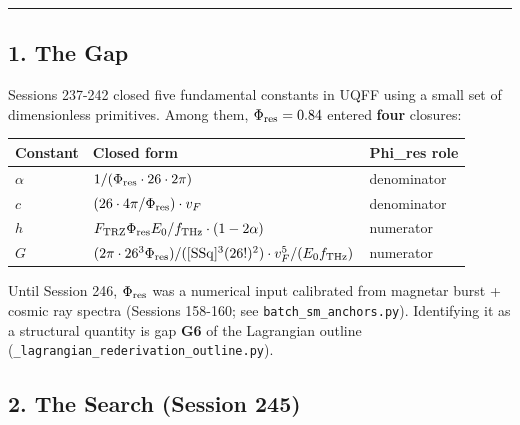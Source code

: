 \documentclass[
]{article}
\newcounter{none} %
\begin{document}
\begin{center}\rule{0.5\linewidth}{0.5pt}\end{center}

\subsection{1. The Gap}\label{the-gap}

Sessions 237-242 closed five fundamental constants in UQFF using a small
set of dimensionless primitives. Among them, \(\Phi_{\rm res} = 0.84\)
entered \textbf{four} closures:

{\def\LTcaptype{none} %
\begin{longtable}[]{@{}
  >{\raggedright\arraybackslash}p{}
  >{\raggedright\arraybackslash}p{}
  >{\raggedright\arraybackslash}p{}@{}}
\toprule\noalign{}
\begin{minipage}[b]{\linewidth}\raggedright
Constant
\end{minipage} & \begin{minipage}[b]{\linewidth}\raggedright
Closed form
\end{minipage} & \begin{minipage}[b]{\linewidth}\raggedright
Phi\_res role
\end{minipage} \\
\midrule\noalign{}
\endhead
\bottomrule\noalign{}
\endlastfoot
\(\alpha\) & \(1/(\Phi_{\rm res} \cdot 26 \cdot 2\pi)\) & denominator \\
\(c\) & \((26 \cdot 4\pi/\Phi_{\rm res}) \cdot v_F\) & denominator \\
\(h\) & \(F_{\rm TRZ} \Phi_{\rm res} E_0/f_{\rm THz} \cdot (1-2\alpha)\)
& numerator \\
\(G\) &
\((2\pi \cdot 26^3 \Phi_{\rm res})/([\mathrm{SSq}]^3 (26!)^2) \cdot v_F^5/(E_0 f_{\rm THz})\)
& numerator \\
\end{longtable}
}

Until Session 246, \(\Phi_{\rm res}\) was a numerical input calibrated
from magnetar burst + cosmic ray spectra (Sessions 158-160; see
\texttt{batch\_sm\_anchors.py}). Identifying it as a structural quantity
is gap \textbf{G6} of the Lagrangian outline
(\texttt{\_lagrangian\_rederivation\_outline.py}).

\subsection{2. The Search (Session 245)}\label{the-search-session-245}
\end{document}
